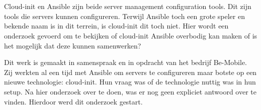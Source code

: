 
%
%

%



\chapter*{}

Cloud-init en Ansible zijn beide server management configuration tools. Dit zijn tools die servers kunnen configureren. Terwijl Ansible toch een grote speler en bekende naam is in dit terrein, is cloud-init dit toch niet. Hier wordt een onderzoek gevoerd om te bekijken of cloud-init Ansible overbodig kan maken of is het mogelijk dat deze kunnen samenwerken?

Dit werk is gemaakt in samenspraak en in opdracht van het bedrijf Be-Mobile. Zij werkten al een tijd met Ansible om servers te configureren maar botste op een nieuwe technologie: cloud-init. Hun vraag was of de technologie nuttig was in hun setup. Na hier onderzoek over te doen, was er nog geen expliciet antwoord over te vinden. Hierdoor werd dit onderzoek gestart.

